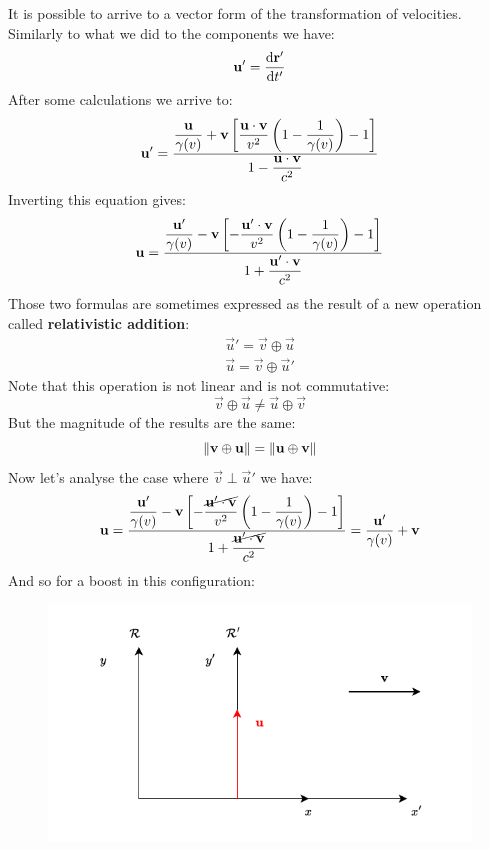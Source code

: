 It is possible to arrive to a vector form of the transformation of velocities. Similarly to what we did to the components we have:
\begin{equation}
  \vec{u}' = \dv{\vec{r}'}{t'}
\end{equation}
After some calculations we arrive to:
\begin{equation}
  \vb{u}' = \dfrac{\dfrac{\vb{u}}{\gamma(v)}+ \vb{v}\left[\dfrac{\vb{u}\cdot\vb{v}}{v^2}\left(1-\dfrac{1}{\gamma(v)}\right)-1\right]}{1 - \dfrac{\vb{u}\cdot\vb{v}}{c^2}}
\end{equation}
Inverting this equation gives:
\begin{equation}
  \vb{u} = \dfrac{\dfrac{\vb{u}'}{\gamma(v)} - \vb{v}\left[-\dfrac{\vb{u}'\cdot\vb{v}}{v^2}\left(1-\dfrac{1}{\gamma(v)}\right)-1\right]}{1 + \dfrac{\vb{u}'\cdot\vb{v}}{c^2}}
\end{equation}
Those two formulas are sometimes expressed as the result of a new operation called \textbf{relativistic addition}:
\begin{equation}
  \begin{split}
    \vec{u}' = \vec{v} \oplus \vec{u} \\[8pt]
    \vec{u} = \vec{v} \oplus \vec{u}'
  \end{split}
\end{equation}
Note that this operation is not linear and is not commutative:
\begin{equation}
  \vec{v} \oplus \vec{u} \neq \vec{u} \oplus \vec{v}
\end{equation}
But the magnitude of the results are the same:
\begin{equation}
  \norm{\vb{v} \oplus \vb{u}} = \norm{\vb{u} \oplus \vb{v}}
\end{equation}
Now let's analyse the case where $\vec{v} \perp \vec{u}'$ we have:
\begin{equation}
  \vb{u} = \dfrac{\dfrac{\vb{u}'}{\gamma(v)} - \vb{v}\left[-\dfrac{\cancel{\vb{u}'\cdot\vb{v}}}{v^2}\left(1-\dfrac{1}{\gamma(v)}\right)-1\right]}{1 + \dfrac{\cancel{\vb{u}'\cdot\vb{v}}}{c^2}} = \dfrac{\vb{u}'}{\gamma (v)} + \vb{v}
\end{equation}
And so for a boost in this configuration:
\begin{figure}[H]
  \centering
  \includegraphics[width=0.6\linewidth]{res/svg/perpendicular_moving.drawio}
\end{figure}
